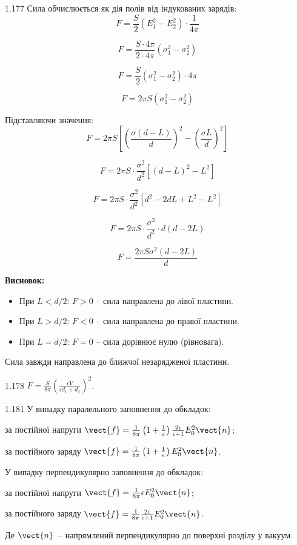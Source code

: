 \begin{Solution}{1.{177}}
Сила обчислюється як дія полів від індукованих зарядів:
$$F = \frac{S}{2}(E_1^2 - E_2^2) \cdot \frac{1}{4\pi}$$

$$F = \frac{S \cdot 4\pi}{2 \cdot 4\pi}(\sigma_1^2 - \sigma_2^2)$$

$$F = \frac{S}{2}(\sigma_1^2 - \sigma_2^2) \cdot 4\pi$$

$$F = 2\pi S(\sigma_1^2 - \sigma_2^2)$$

Підставляючи значення:
$$F = 2\pi S\left[\left(\frac{\sigma(d-L)}{d}\right)^2 - \left(\frac{\sigma L}{d}\right)^2\right]$$

$$F = 2\pi S \cdot \frac{\sigma^2}{d^2}[(d-L)^2 - L^2]$$

$$F = 2\pi S \cdot \frac{\sigma^2}{d^2}[d^2 - 2dL + L^2 - L^2]$$

$$F = 2\pi S \cdot \frac{\sigma^2}{d^2} \cdot d(d - 2L)$$

$$F = \frac{2\pi S\sigma^2(d - 2L)}{d}$$

\textbf{Висновок:}
\begin{itemize}
    \item При $L < d/2$: $F > 0$ -- сила направлена до лівої пластини.
    \item При $L > d/2$: $F < 0$ -- сила направлена до правої пластини.
    \item При $L = d/2$: $F = 0$ -- сила дорівнює нулю (рівновага).
\end{itemize}

Сила завжди направлена до ближчої незарядженої пластини.
\end{Solution}
\begin{Solution}{1.{178}}
	$ F = \frac{S}{8\pi} \left( \frac{\epsilon V}{ \epsilon d_1 + d_2} \right)^2 $.
\end{Solution}
\begin{Solution}{1.{181}}
		У випадку паралельного заповнення до обкладок:
		\begin{enumerate*}[label=\alph*)]
			\item за постійної напруги
			$\vect{f} = \frac{1}{8\pi}\left( 1+\frac1\epsilon\right) \frac{2\epsilon}{\epsilon + 1} E_0^2 \vect{n}$;
			\item за постійного заряду
			$\vect{f} = \frac{1}{8\pi}\left( 1+\frac1\epsilon\right) E_0^2 \vect{n}$.
		\end{enumerate*}
		У випадку перпендикулярно заповнення до обкладок:
		\begin{enumerate*}[label=\alph*)]
			\item за постійної напруги
			$\vect{f} = \frac{1}{8\pi}\epsilon E_0^2 \vect{n}$;
			\item за постійного заряду
			$\vect{f} = \frac{1}{8\pi} \frac{2\epsilon }{\epsilon + 1} E_0^2 \vect{n}$.
		\end{enumerate*}
		Де $\vect{n}$~-- напрямлений перпендикулярно до поверхні розділу у вакуум.
	
\end{Solution}
